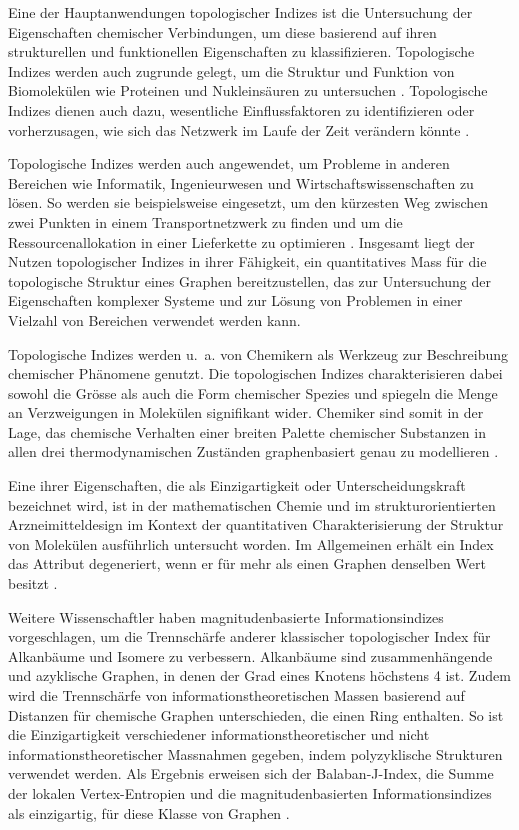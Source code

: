Eine der Hauptanwendungen topologischer Indizes ist die Untersuchung der Eigenschaften chemischer Verbindungen, um diese basierend auf ihren strukturellen und funktionellen Eigenschaften zu klassifizieren. Topologische Indizes werden auch zugrunde gelegt, um die Struktur und Funktion von Biomolekülen wie Proteinen und Nukleinsäuren zu untersuchen \cite[p.~1015]{gonzalez-diaz_medicinal_2007}.
Topologische Indizes dienen auch dazu, wesentliche Einflussfaktoren zu identifizieren oder vorherzusagen, wie sich das Netzwerk im Laufe der Zeit verändern könnte \cite[p.~400]{watts_collective_1998}.

Topologische Indizes werden auch angewendet, um Probleme in anderen Bereichen wie Informatik, Ingenieurwesen und Wirtschaftswissenschaften zu lösen. So werden sie beispielsweise eingesetzt, um den kürzesten Weg zwischen zwei Punkten in einem Transportnetzwerk zu finden \cite{dijkstra_note_1959} und um die Ressourcenallokation in einer Lieferkette zu optimieren \cite{bazaraa_nonlinear_2013}.
Insgesamt liegt der Nutzen topologischer Indizes in ihrer Fähigkeit, ein quantitatives Mass für die topologische Struktur eines Graphen bereitzustellen, das zur Untersuchung der Eigenschaften komplexer Systeme und zur Lösung von Problemen in einer Vielzahl von Bereichen verwendet werden kann.

Topologische Indizes werden u. a. von Chemikern als Werkzeug zur Beschreibung chemischer Phänomene genutzt.
Die topologischen Indizes charakterisieren dabei sowohl die Grösse als auch die Form chemischer Spezies und spiegeln die Menge an Verzweigungen in Molekülen signifikant wider.
Chemiker sind somit in der Lage, das chemische Verhalten einer breiten Palette chemischer Substanzen in allen drei thermodynamischen Zuständen graphenbasiert genau zu modellieren \cite[p.~1]{rouvray_modeling_1987}.

Eine ihrer Eigenschaften, die als Einzigartigkeit oder Unterscheidungskraft bezeichnet wird, ist in der mathematischen Chemie und im strukturorientierten Arzneimitteldesign im Kontext der quantitativen Charakterisierung der Struktur von Molekülen ausführlich untersucht worden.
Im Allgemeinen erhält ein Index das Attribut degeneriert, wenn er für mehr als einen Graphen denselben Wert besitzt \cite[p.~1]{dehmer_information_2012}.

Weitere Wissenschaftler haben magnitudenbasierte Informationsindizes vorgeschlagen, um die Trennschärfe anderer klassischer topologischer Index für Alkanbäume und Isomere zu verbessern.
Alkanbäume sind zusammenhängende und azyklische Graphen, in denen der Grad eines Knotens höchstens 4 ist.
Zudem wird die Trennschärfe von informationstheoretischen Massen basierend auf Distanzen für chemische Graphen unterschieden, die einen Ring enthalten.
So ist die Einzigartigkeit verschiedener informationstheoretischer und nicht informationstheoretischer Massnahmen gegeben, indem polyzyklische Strukturen verwendet werden.
Als Ergebnis erweisen sich der Balaban-J-Index, die Summe der lokalen Vertex-Entropien und die magnitudenbasierten Informationsindizes als einzigartig, für diese Klasse von Graphen \cite[p.~1]{dehmer_information_2012}.

